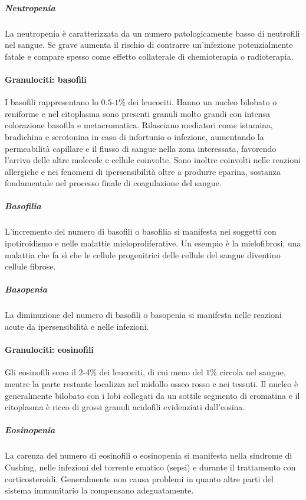 				\subparagraph{Neutropenia}
				La neutropenia \`e caratterizzata da un numero patologicamente basso di neutrofili nel sangue.
				Se grave aumenta il rischio di contrarre un'infezione potenzialmente fatale e compare spesso come effetto collaterale di chemioterapia o radioterapia.

			\paragraph{Granulociti: basofili}
			I basofili rappresentano lo $0.5$-$1\%$ dei leucociti. 
			Hanno un nucleo bilobato o reniforme e nel citoplasma sono presenti granuli molto grandi con intensa colorazione basofila e metacromatica.
			Rilasciano mediatori come istamina, bradichina e serotonina in caso di infortunio o infezione, aumentando la permeabilit\`a capillare e il flusso di sangue nella zona interessata, favorendo l'arrivo delle altre molecole e cellule coinvolte.
			Sono inoltre coinvolti nelle reazioni allergiche e nei fenomeni di ipersensibilit\`a oltre a produrre eparina, sostanza fondamentale nel processo finale di coagulazione del sangue.


				\subparagraph{Basofilia}
				L'incremento del numero di basofili o basofilia si manifesta nei soggetti con ipotiroidismo e nelle malattie mieloproliferative. 
				Un esempio \`e la mielofibrosi, una malattia che fa s\`i che le cellule progenitrici delle cellule del sangue diventino cellule fibrose.

				\subparagraph{Basopenia}
				La diminuzione del numero di basofili o basopenia si manifesta nelle reazioni acute da ipersensibilit\`a e nelle infezioni.

			\paragraph{Granulociti: eosinofili}
			Gli eosinofili sono il $2$-$4\%$ dei leucociti, di cui meno del $1\%$ circola nel sangue, mentre la parte restante localizza nel midollo osseo rosso e nei tessuti.
			Il nucleo \`e generalmente bilobato con i lobi collegati da un sottile segmento di cromatina e il citoplasma \`e ricco di grossi granuli acidofili evidenziati dall'eosina. 

				\subparagraph{Eosinopenia}
				La carenza del numero di eosinofili o eosinopenia si manifesta nella sindrome di Cushing, nelle infezioni del torrente ematico (sepsi) e durante il trattamento con corticosteroidi. 
				Generalmente non causa problemi in quanto altre parti del sistema immunitario la compensano adeguatamente.


